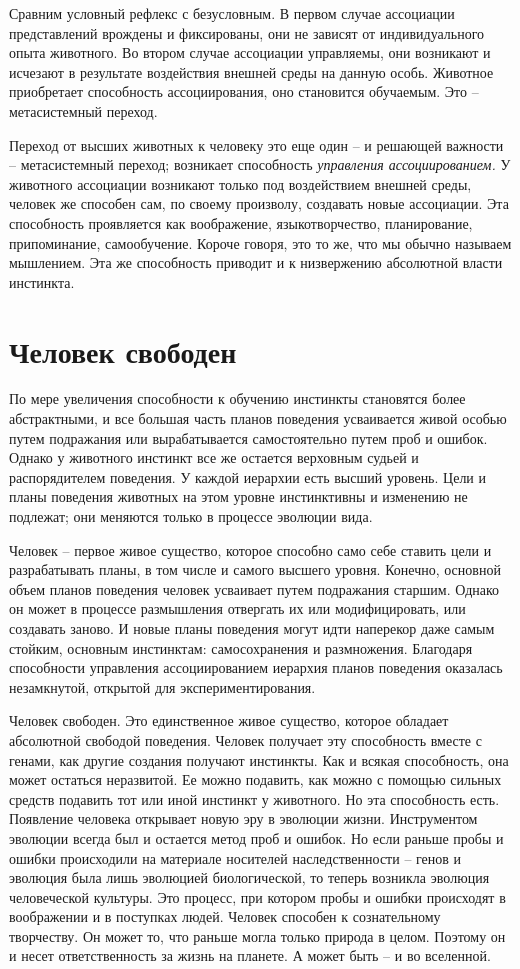 \documentclass{book}
\begin{document}
Сравним условный рефлекс с безусловным. В первом случае ассоциации представлений врождены и фиксированы, они не зависят от 
индивидуального опыта животного. Во втором случае ассоциации управляемы,  они возникают и исчезают в результате воздействия 
внешней среды на данную особь. Животное приобретает способность ассоциирования,  оно становит­ся обучаемым. Это -- метасистемный 
переход.

Переход от высших животных к человеку это еще один -- и решающей важности -- метасистемный переход; возникает способность 
\textit{управления ассоциированием.}  У животного ассоциации возникают только под воздействием внешней среды, человек же 
способен сам, по своему произволу, создавать новые ассоциации. Эта способность проявляется как воображение, языкотворчество, 
планирование, припоминание, самообучение. Короче говоря, это то же, что мы обычно называем мышлением.  Эта же способность 
приводит и к низвержению абсолютной власти инстинкта.


\section{Человек свободен}

По мере увеличения способности к обучению инстинкты становятся более абстрактными, и все большая часть планов поведения 
усваивается живой особью путем подражания или вырабатывается самостоятельно путем проб и ошибок. Однако у животного инстинкт все 
же остается верховным судьей и распорядителем поведения. У каждой иерархии есть высший уровень. Цели и планы поведения животных 
на этом уровне инстинктивны и изменению не подлежат; они меняются только в процессе эволюции вида.

Человек -- первое живое существо, которое способно само себе ставить цели и разрабатывать планы, в том числе и самого высшего 
уровня. Конечно, основной объем планов поведения человек усваивает путем подражания старшим. Однако он мо­жет в процессе 
размышления отвергать их или модифициро­вать, или создавать заново. И новые планы поведения могут идти наперекор даже самым 
стойким, основным инстинктам: самосохранения и размножения. Благодаря способности управ­ления ассоциированием иерархия планов 
поведения оказалась незамкнутой, открытой для экспериментирования.

Человек свободен. Это единственное живое существо, кото­рое обладает абсолютной свободой поведения. Человек полу­чает эту 
способность вместе с генами, как другие создания по­лучают инстинкты. Как и всякая способность, она может остать­ся неразвитой. Ее 
можно подавить, как можно с помощью сильных средств подавить тот или иной инстинкт у животного. Но эта способность есть.
Появление человека открывает новую эру в эволюции жиз­ни. Инструментом эволюции всегда был и остается метод проб и ошибок. Но 
если раньше пробы и ошибки происходили на материале носителей наследственности -- генов и эволюция была лишь эволюцией 
биологической, то теперь возникла эво­люция человеческой культуры. Это процесс, при котором про­бы и ошибки происходят в 
воображении и в поступках людей. Человек способен к сознательному творчеству. Он может то, что раньше могла только природа в 
целом. Поэтому он и несет ответственность за жизнь на планете. А может быть -- и во вселенной.
\end{document}
